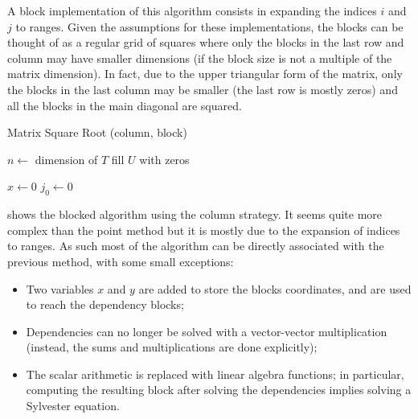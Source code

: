 \documentclass[../thesis]{subfiles}
\begin{document}
	A block implementation of this algorithm consists in expanding the indices $i$ and $j$ to ranges. Given the assumptions for these implementations, the blocks can be thought of as a regular grid of squares where only the blocks in the last row and column may have smaller dimensions (if the block size is not a multiple of the matrix dimension). In fact, due to the upper triangular form of the matrix, only the blocks in the last column may be smaller (the last row is mostly zeros) and all the blocks in the main diagonal are squared.

	\begin{algorithm}[htp]
		\caption{Matrix Square Root (column, block)}
		\label{alg:sqrtm:column:block}
		\DontPrintSemicolon


		$n \leftarrow$ dimension of $T$\;
		fill $U$ with zeros\;

		$x \leftarrow 0$\;
		$j_0 \leftarrow 0$\;
	\end{algorithm}

	 shows the blocked algorithm using the column strategy. It seems quite more complex than the point method but it is mostly due to the expansion of indices to ranges. As such most of the algorithm can be directly associated with the previous method, with some small exceptions:
	\begin{itemize}
		\item Two variables $x$ and $y$ are added to store the blocks coordinates, and are used to reach the dependency blocks;
		\item Dependencies can no longer be solved with a vector-vector multiplication (instead, the sums and multiplications are done explicitly);
		\item The scalar arithmetic is replaced with linear algebra functions; in particular, computing the resulting block after solving the dependencies implies solving a Sylvester equation.
	\end{itemize}
\end{document}

